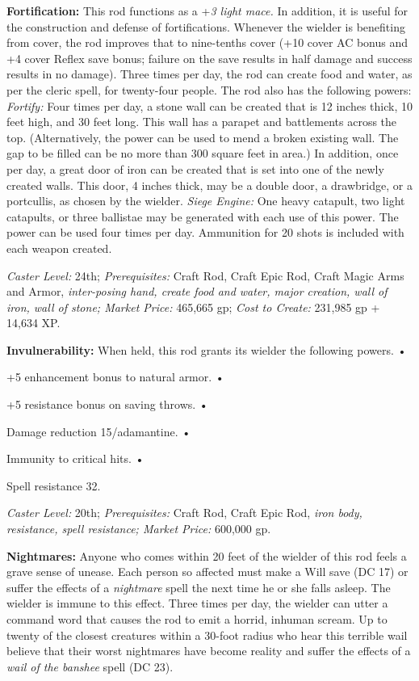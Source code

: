 \documentclass{article}
\begin{document}
\textbf{Fortification: }This rod functions as a +\textit{3 light mace. }In addition, 
it is useful for the construction and defense of fortifications. Whenever the wielder 
is benefiting from cover, the rod improves that to nine-tenths cover (+10 cover 
AC bonus and +4 cover Reflex save bonus; failure on the save results in half damage 
and success results in no damage). Three times per day, the rod can create food 
and water, as per the cleric spell, for twenty-four people. The rod also has the 
following powers: \textit{Fortify: }Four times per day, a stone wall can be created 
that is 12 inches thick, 10 feet high, and 30 feet long. This wall has a parapet 
and battlements across the top. (Alternatively, the power can be used to mend a 
broken existing wall. The gap to be filled can be no more than 300 square feet 
in area.) In addition, once per day, a great door of iron can be created that is 
set into one of the newly created walls. This door, 4 inches thick, may be a double 
door, a drawbridge, or a portcullis, as chosen by the wielder. \textit{Siege Engine: 
}One heavy catapult, two light catapults, or three ballistae may be generated with 
each use of this power. The power can be used four times per day. Ammunition for 
20 shots is included with each weapon created. 

\textit{Caster Level: }24th; \textit{Prerequisites: }Craft Rod, Craft Epic Rod, 
Craft Magic Arms and Armor, \textit{inter-posing hand, create food and water, major 
creation, wall of iron, wall of stone; Market Price: }465,665 gp; \textit{Cost 
to Create: }231,985 gp + 14,634 XP. 

\textbf{Invulnerability: }When held, this rod grants its wielder the following 
powers. • 

\parindent=3pt
+5 enhancement bonus to natural armor. • 

+5 resistance bonus on saving throws. • 

\parindent=7pt
Damage reduction 15/adamantine. • 

\parindent=3pt
Immunity to critical hits. • 

Spell resistance 32. 

\parindent=0pt
\textit{Caster Level: }20th; \textit{Prerequisites: }Craft Rod, Craft Epic Rod, 
\textit{iron body, resistance, spell resistance; Market Price: }600,000 gp. 

\textbf{Nightmares: }Anyone who comes within 20 feet of the wielder of this rod 
feels a grave sense of unease. Each person so affected must make a Will save (DC 
17) or suffer the effects of a \textit{nightmare }spell the next time he or she 
falls asleep. The wielder is immune to this effect. Three times per day, the wielder 
can utter a command word that causes the rod to emit a horrid, inhuman scream. 
Up to twenty of the closest creatures within a 30-foot radius who hear this terrible 
wail believe that their worst nightmares have become reality and suffer the effects 
of a \textit{wail of the banshee }spell (DC 23). 
\end{document}
